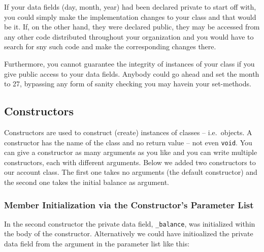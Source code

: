 If your data fields (day, month, year) had been declared private to start 
off with, you could simply make the implementation changes to your class
and that would be it. If, on the other hand, they were declared public,
they may be accessed from any other code distributed throughout your 
organization and you would have to search for sny such code and make
the corresponding changes there.

Furthermore, you cannot guarantee the integrity of instances of your class
if you give public access to your data fields. Anybody could go ahead
and set the month to 27, bypassing any form of sanity checking you may
havein your set-methods.


\subsection{Constructors \label{secConstructors}}

Constructors are used to construct (create) instances of classes -- i.e.\
objects. A constructor has the name of the class and no return value --
not even \verb+void+. You can give a constructor as many arguments as you 
like and you can write multiple constructors, each with different arguments.
Below we added two constructors to our account class. The first one takes no
arguments (the default constructor) and the second one takes the initial 
balance as argument.

\noindent {\small }


\subsubsection{Member Initialization via the Constructor's Parameter List}

In the second constructor the private data field, \verb+_balance+, was
initialized within the body of the constructor. Alternatively we could have 
initioalized the private data field from the argument in the parameter
list like this:


